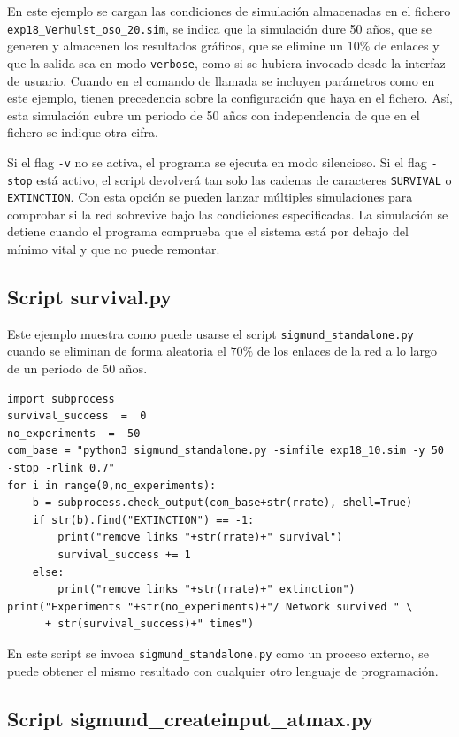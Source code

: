 En este ejemplo se cargan las condiciones de simulación almacenadas en el fichero \texttt{exp18\_Verhulst\_oso\_20.sim}, se indica que la simulación dure 50 años, que se generen y almacenen los resultados gráficos, que se elimine un $10\%$ de enlaces y que la salida sea en modo \texttt{verbose}, como si se hubiera invocado desde la interfaz de usuario. Cuando en el comando de llamada se incluyen parámetros como en este ejemplo, tienen precedencia sobre la configuración que haya en el fichero. Así, esta simulación cubre un periodo de 50 años con independencia de que en el fichero se indique otra cifra.  

Si el flag \texttt{-v} no se activa, el programa se ejecuta en modo silencioso. Si el flag \texttt{-stop} está activo, el script devolverá tan solo las cadenas de caracteres \texttt{SURVIVAL} o \texttt{EXTINCTION}. Con esta opción se pueden lanzar múltiples simulaciones para comprobar si la red sobrevive bajo las condiciones especificadas. La simulación se detiene cuando el programa comprueba que el sistema está por debajo del mínimo vital y que no puede remontar.


\subsection{Script survival.py}

\noindent Este ejemplo muestra como puede usarse el script \texttt{sigmund\_standalone.py} cuando se eliminan de forma aleatoria el $70\%$ de los enlaces de la red a lo largo de un periodo de 50 años.

\fontsize{3mm}{3mm}\selectfont
\begin{verbatim}
import subprocess
survival_success  =  0
no_experiments  =  50
com_base = "python3 sigmund_standalone.py -simfile exp18_10.sim -y 50 -stop -rlink 0.7"
for i in range(0,no_experiments):
    b = subprocess.check_output(com_base+str(rrate), shell=True)
    if str(b).find("EXTINCTION") == -1:
        print("remove links "+str(rrate)+" survival")
        survival_success += 1
    else:
        print("remove links "+str(rrate)+" extinction")
print("Experiments "+str(no_experiments)+"/ Network survived " \
      + str(survival_success)+" times")
\end{verbatim}
\normalsize

En este script se invoca \texttt{sigmund\_standalone.py} como un proceso externo, se puede obtener el mismo resultado con cualquier
otro lenguaje de programación.

\subsection{Script sigmund\_createinput\_atmax.py}


